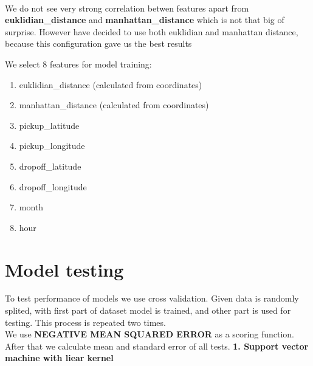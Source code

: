 \documentclass[11pt]{article}
\providecommand{\tightlist}{%
      \setlength{\itemsep}{0pt}\setlength{\parskip}{0pt}}
\begin{document}
    \begin{center}
    \end{center}
    { \hspace*{\fill} \\}
    
    We do not see very strong correlation betwen features apart from
\textbf{euklidian\_distance} and \textbf{manhattan\_distance} which is
not that big of surprise. However have decided to use both euklidian and
manhattan distance, because this configuration gave us the best results

    

    We select 8 features for model training:

\begin{enumerate}
\def\labelenumi{\arabic{enumi}.}
\tightlist
\item
  euklidian\_distance (calculated from coordinates)
\item
  manhattan\_distance (calculated from coordinates)
\item
  pickup\_latitude
\item
  pickup\_longitude
\item
  dropoff\_latitude
\item
  dropoff\_longitude
\item
  month
\item
  hour
\end{enumerate}

    \section{Model testing}\label{model-testing}

    To test performance of models we use cross validation. Given data is
randomly splited, with first part of dataset model is trained, and other
part is used for testing. This process is repeated two times.\\
We use \textbf{NEGATIVE MEAN SQUARED ERROR} as a scoring function. \\
After that we calculate mean and standard error of all tests.
\textbf{1. Support vector machine with liear kernel}
\end{document}
